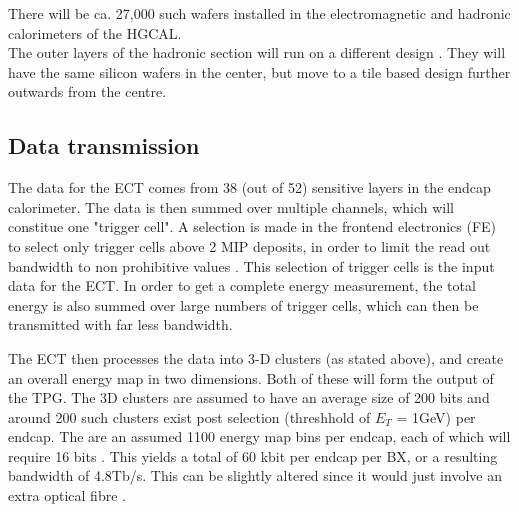 \documentclass[12 pt]{article}
\begin{document}
			There will be ca. 27,000 such wafers installed in the electromagnetic and hadronic calorimeters of the HGCAL. \\
			The outer layers of the hadronic section will run on a different design \cite{TDR}. They will have the same silicon wafers in the center, but move to a tile based design further outwards from the centre. 



		\subsection{Data transmission}
			The data for the ECT comes from 38 (out of 52) sensitive layers in the endcap calorimeter. The data is then summed over multiple channels, which will constitue one "trigger cell". A selection is made in the frontend electronics (FE) to select only trigger cells above 2 MIP deposits, in order to limit the read out bandwidth to non prohibitive values \cite{itdr}. This selection of trigger cells is the input data for the ECT. In order to get a complete energy measurement, the total energy is also summed over large numbers of trigger cells, which can then be transmitted with far less bandwidth. 

			The ECT then processes the data into 3-D clusters (as stated above), and create an overall energy map in two dimensions. Both of these will form the output of the TPG. The 3D clusters are assumed to have an average size of 200 bits \cite{TDR} and around 200 such clusters exist post selection (threshhold of $E_T$ = 1GeV) per endcap. The are an assumed 1100 energy map bins per endcap, each of which will require 16 bits \cite{TDR}. This yields a total of 60 kbit per endcap per BX, or a resulting bandwidth of 4.8Tb/s. This can be slightly altered since it would just involve an extra optical fibre \cite{TDR}. 
		
\end{document}
